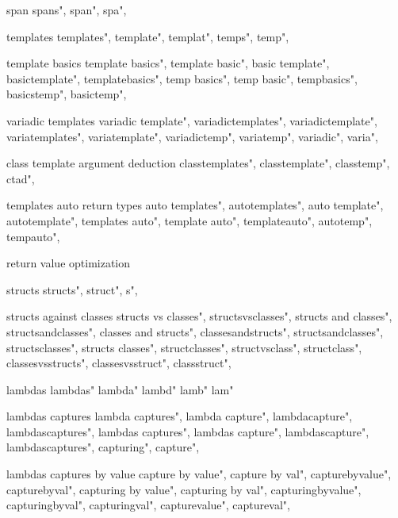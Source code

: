          span 
        spans",  
        span",  
        spa",  
        
         templates
        templates",
        template",
        templat",
        temps",
        temp",
        
         template basics 
        template basics",  
        template basic",  
        basic template",  
        basictemplate",  
        templatebasics",  
        temp basics",  
        temp basic",  
        tempbasics",  
        basicstemp",  
        basictemp",  
        
         variadic templates
        variadic template",  
        variadictemplates",  
        variadictemplate",  
        variatemplates",  
        variatemplate",  
        variadictemp",  
        variatemp",  
        variadic",  
        varia",  
        
         class template argument deduction 
        classtemplates",  
        classtemplate",  
        classtemp",  
        ctad", 
        
         templates auto return types 
        auto templates",  
        autotemplates",  
        auto template",  
        autotemplate",  
        templates auto",  
        template auto",  
        templateauto",  
        autotemp",  
        tempauto",  
        
         return value optimization 
        
         structs 
        structs",
        struct",
        s",
        
         structs against classes 
        structs vs classes",  
        structsvsclasses",  
        structs and classes",  
        structsandclasses",  
        classes and structs",  
        classesandstructs",  
        structsandclasses",  
        structsclasses",  
        structs classes",  
        structclasses",  
        structvsclass",  
        structclass",  
        classesvsstructs",  
        classesvsstruct",  
        classstruct",  
        
         lambdas
        lambdas"
        lambda"
        lambd"
        lamb"
        lam"
        
         lambdas captures
        lambda captures",  
        lambda capture",  
        lambdacapture",  
        lambdascaptures",  
        lambdas captures",  
        lambdas capture",  
        lambdascapture",  
        lambdascaptures",  
        capturing",  
        capture",  
        
         lambdas captures by value
        capture by value",  
        capture by val",  
        capturebyvalue",  
        capturebyval",  
        capturing by value",  
        capturing by val",  
        capturingbyvalue",  
        capturingbyval",  
        capturingval",  
        capturevalue",  
        captureval",  
        
